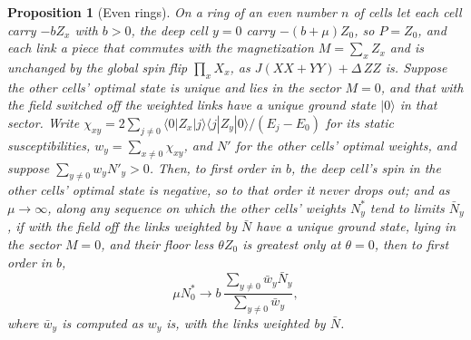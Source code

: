 \documentclass[aps,prd,reprint,superscriptaddress]{revtex4-2}
\newtheorem{proposition}{Proposition}
\begin{document}
\begin{proposition}[Even rings]\label{prop:parity}
On a ring of an even number $n$ of cells let each cell carry $-bZ_x$ with $b > 0$, the deep cell $y = 0$ carry $-(b + \mu) Z_0$, so $P = Z_0$, and each link a piece that commutes with the magnetization $M = \sum_x Z_x$ and is unchanged by the global spin flip $\prod_x X_x$, as $J(XX + YY) + \Delta\, ZZ$ is. Suppose the other cells' optimal state is unique and lies in the sector $M = 0$, and that with the field switched off the weighted links have a unique ground state $|0\rangle$ in that sector. Write $\chi_{xy} = 2\sum_{j \neq 0} \langle 0|Z_x|j\rangle\langle j|Z_y|0\rangle / (E_j - E_0)$ for its static susceptibilities, $w_y = \sum_{x\neq 0}\chi_{xy}$, and $N'$ for the other cells' optimal weights, and suppose $\sum_{y\neq0} w_y N'_y > 0$. Then, to first order in $b$, the deep cell's spin in the other cells' optimal state is negative, so to that order it never drops out; and as $\mu \to \infty$, along any sequence on which the other cells' weights $N^*_y$ tend to limits $\bar N_y$, if with the field off the links weighted by $\bar N$ have a unique ground state, lying in the sector $M = 0$, and their floor less $\theta Z_0$ is greatest only at $\theta = 0$, then to first order in $b$,
\begin{equation}
  \mu N^*_0 \to b\, \frac{\sum_{y\neq 0} \bar w_y \bar N_y}{\sum_{y \neq 0} \bar w_y},
  \label{eq:law}
\end{equation}
where $\bar w_y$ is computed as $w_y$ is, with the links weighted by $\bar N$.
\end{proposition}
\end{document}
